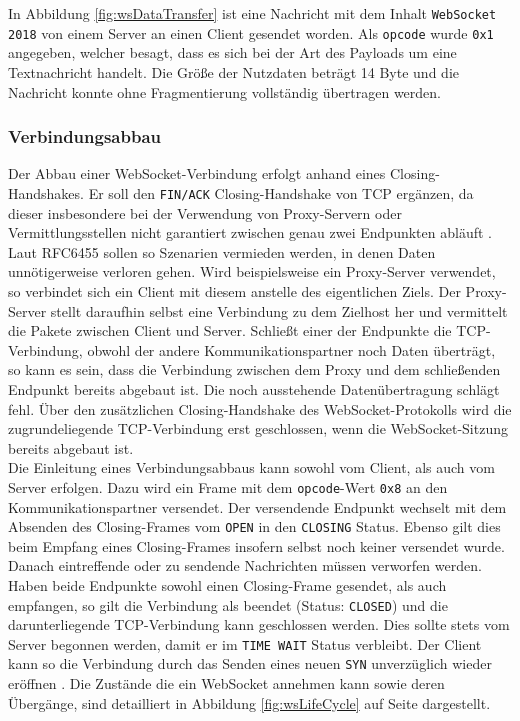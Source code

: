 \documentclass[11pt,a4paper,titlepage]{scrartcl}
\numberwithin{equation}{section}
\begin{document}
\noindent In Abbildung \ref{fig:wsDataTransfer} ist eine Nachricht mit dem Inhalt \texttt{WebSocket 2018} von einem Server an einen Client gesendet worden. Als \texttt{opcode} wurde \texttt{0x1} angegeben, welcher besagt, dass es sich bei der Art des Payloads um eine Textnachricht handelt. Die Größe der Nutzdaten beträgt 14 Byte und die Nachricht konnte ohne Fragmentierung vollständig übertragen werden.

\subsubsection{Verbindungsabbau}\label{subsubsec:wsClose}
Der Abbau einer WebSocket-Verbindung erfolgt anhand eines Closing-Handshakes. Er soll den \texttt{FIN/ACK} Closing-Handshake von TCP ergänzen, da dieser insbesondere bei der Verwendung von Proxy-Servern oder Vermittlungsstellen nicht garantiert zwischen genau zwei Endpunkten abläuft \autocite[9]{fette_websocket_2011}. Laut RFC6455 sollen so Szenarien vermieden werden, in denen Daten unnötigerweise verloren gehen. Wird beispielsweise ein Proxy-Server verwendet, so verbindet sich ein Client mit diesem anstelle des eigentlichen Ziels. Der Proxy-Server stellt daraufhin selbst eine Verbindung zu dem Zielhost her und vermittelt die Pakete zwischen Client und Server. Schließt einer der Endpunkte die TCP-Verbindung, obwohl der andere Kommunikationspartner noch Daten überträgt, so kann es sein, dass die Verbindung zwischen dem Proxy und dem schließenden Endpunkt bereits abgebaut ist. Die noch ausstehende Datenübertragung schlägt fehl. Über den zusätzlichen Closing-Handshake des WebSocket-Protokolls wird die zugrundeliegende TCP-Verbindung erst geschlossen, wenn die WebSocket-Sitzung bereits abgebaut ist.\\

\noindent Die Einleitung eines Verbindungsabbaus kann sowohl vom Client, als auch vom Server erfolgen. Dazu wird ein Frame mit dem \texttt{opcode}-Wert \texttt{0x8} an den Kommunikationspartner versendet. Der versendende Endpunkt wechselt mit dem Absenden des Closing-Frames vom \texttt{OPEN} in den \texttt{CLOSING} Status. Ebenso gilt dies beim Empfang eines Closing-Frames insofern selbst noch keiner versendet wurde. Danach eintreffende oder zu sendende Nachrichten müssen verworfen werden. Haben beide Endpunkte sowohl einen Closing-Frame gesendet, als auch empfangen, so gilt die Verbindung als beendet (Status: \texttt{CLOSED}) und die darunterliegende TCP-Verbindung kann geschlossen werden. Dies sollte stets vom Server begonnen werden, damit er im \texttt{TIME WAIT} Status verbleibt. Der Client kann so die Verbindung durch das Senden eines neuen \texttt{SYN} unverzüglich wieder eröffnen \autocite[41]{fette_websocket_2011}. Die Zustände die ein WebSocket annehmen kann sowie deren Übergänge, sind detailliert in Abbildung \ref{fig:wsLifeCycle} auf Seite \pageref{fig:wsLifeCycle} dargestellt. \\
\end{document}
